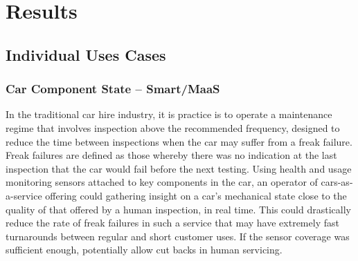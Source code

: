 \documentclass[journal]{IEEEtran}
\begin{document}
\section{Results}





\subsection{Individual Uses Cases}

\subsubsection{Car Component State -- Smart/MaaS}

In the traditional car hire industry, it is practice is to operate a
maintenance regime that involves inspection above the recommended
frequency, designed to reduce the time between inspections when the
car may suffer from a freak failure. Freak failures are defined as
those whereby there was no indication at the last inspection that the
car would fail before the next testing. Using health and usage
monitoring sensors attached to key components in the car, an operator
of cars-as-a-service offering could gathering insight on a car's
mechanical state close to the quality of that offered by a human
inspection, in real time. This could drastically reduce the rate of
freak failures in such a service that may have extremely fast
turnarounds between regular and short customer uses. If the sensor
coverage was sufficient enough, potentially allow cut backs in human
servicing.
\end{document}

